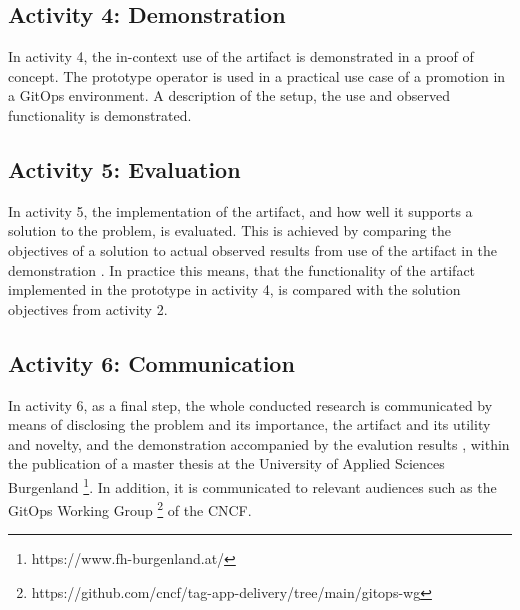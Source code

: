 \subsection{Activity 4: Demonstration}
\label{methodology:activity4}

\noindent
In activity 4,
the in-context use of the artifact is demonstrated in a proof of concept.
The prototype operator is used in a practical use case of a promotion in a GitOps environment.
A description of the setup, the use and observed functionality is demonstrated.
%
\bigskip

\subsection{Activity 5: Evaluation}
\label{methodology:activity5}

\noindent
In activity 5,
the implementation of the artifact,
and how well it supports a solution to the problem,
is evaluated.
This is achieved by
comparing the objectives of a solution to actual observed results
from use of the artifact in the demonstration
\autocite{designScienceResearchMethodologyForInformationSystemsResearch}.
In practice this means, that
the functionality of the artifact implemented in the prototype in activity 4,
is compared with the solution objectives from activity 2.
\bigskip

\subsection{Activity 6: Communication}
\label{methodology:activity6}

\noindent
In activity 6, as a final step,
the whole conducted research is communicated by means of
disclosing
the problem and its importance,
the artifact and its utility and novelty,
and the demonstration accompanied by the evalution results
\autocite{designScienceResearchMethodologyForInformationSystemsResearch},
within the publication of a master thesis at
the University of Applied Sciences Burgenland
\footnote{https://www.fh-burgenland.at/}.
In addition, it is communicated to relevant audiences such as
the GitOps Working Group
\footnote{https://github.com/cncf/tag-app-delivery/tree/main/gitops-wg}
of the CNCF.






